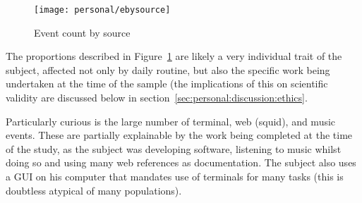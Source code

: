 

\begin{figure}[hp]
    \centering
    \texttt{[image: personal/ebysource]}
    \caption{Event count by source}
    \label{fig:personal:eventsbysource}
\end{figure}

The proportions described in Figure~\ref{fig:personal:eventsbysource} are likely a very individual trait of the subject, affected not only by daily routine, but also the specific work being undertaken at the time of the sample (the implications of this on scientific validity are discussed below in section~\ref{sec:personal:discussion:ethics}.

Particularly curious is the large number of terminal, web (squid), and music events.  These are partially explainable by the work being completed at the time of the study, as the subject was developing software, listening to music whilst doing so and using many web references as documentation.  The subject also uses a GUI on his computer that mandates use of terminals for many tasks (this is doubtless atypical of many populations).




